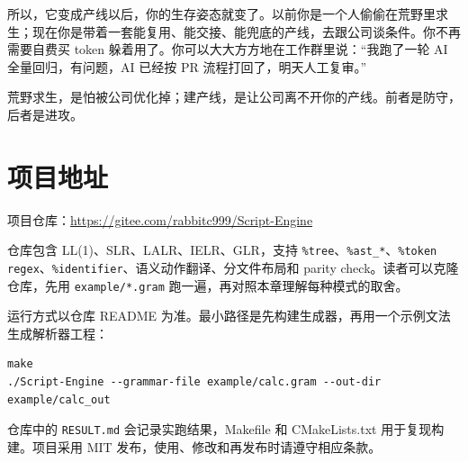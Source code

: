 所以，它变成产线以后，你的生存姿态就变了。以前你是一个人偷偷在荒野里求生；现在你是带着一套能复用、能交接、能兜底的产线，去跟公司谈条件。你不再需要自费买 token 躲着用了。你可以大大方方地在工作群里说：“我跑了一轮 AI 全量回归，有问题，AI 已经按 PR 流程打回了，明天人工复审。”

荒野求生，是怕被公司优化掉；建产线，是让公司离不开你的产线。前者是防守，后者是进攻。

\section{项目地址}

项目仓库：\url{https://gitee.com/rabbitc999/Script-Engine}

仓库包含 LL(1)、SLR、LALR、IELR、GLR，支持 \texttt{\%tree}、\texttt{\%ast\_*}、\texttt{\%token regex}、\texttt{\%identifier}、语义动作翻译、分文件布局和 parity check。读者可以克隆仓库，先用 \texttt{example/*.gram} 跑一遍，再对照本章理解每种模式的取舍。

运行方式以仓库 README 为准。最小路径是先构建生成器，再用一个示例文法生成解析器工程：

\begin{lstlisting}
make
./Script-Engine --grammar-file example/calc.gram --out-dir example/calc_out
\end{lstlisting}

仓库中的 \texttt{RESULT.md} 会记录实跑结果，Makefile 和 CMakeLists.txt 用于复现构建。项目采用 MIT 发布，使用、修改和再发布时请遵守相应条款。
